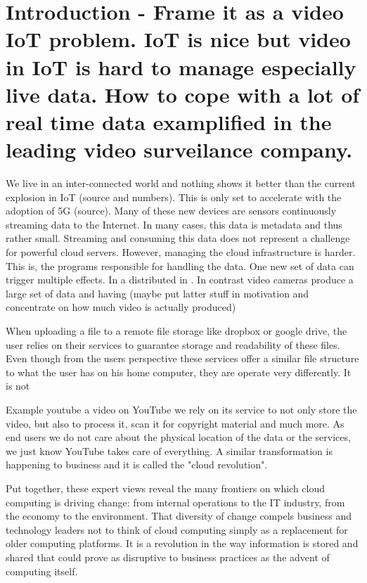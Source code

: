 \section{Introduction - Frame it as a video IoT problem. IoT is nice but video in IoT is hard to manage especially live data. How to cope with a lot of real time data examplified in the leading video surveilance company.}
We live in an inter-connected world and nothing shows it better than the current explosion in IoT (source and numbers). This is only set to accelerate with the adoption of 5G (source). Many of these new devices are sensors continuously streaming data to the Internet. In many cases, this data is metadata and thus rather small. Streaming and consuming this data does not represent a challenge for powerful cloud servers. However, managing the cloud infrastructure is harder. This is, the programs responsible for handling the data. One new set of data can trigger multiple effects. In a distributed  in  . In contrast video cameras produce a large set of data and having  (maybe put latter stuff in motivation and concentrate on how much video is actually produced)


When uploading a file to a remote file storage like dropbox or google drive, the user relies on their services to guarantee storage and readability of these files. Even though from the users perspective these services offer a similar file structure to what the user has on his home computer, they are operate very differently. It is not 

Example youtube
a video on YouTube we rely on its service to not only store the video, but also to process it, scan it for copyright material and much more. As end users we do not care about the physical location of the data or the services, we just know YouTube takes care of everything. A similar transformation is happening to business and it is called the "cloud revolution". 



Put together, these expert views reveal the many frontiers on which cloud computing is driving
change: from internal operations to the IT industry, from the economy to the environment. That
diversity of change compels business and technology leaders not to think of cloud computing
simply as a replacement for older computing platforms. It is a revolution in the way information
is stored and shared that could prove as disruptive to business practices as the advent of
computing itself. 

